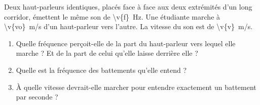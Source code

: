 Deux haut-parleurs identiques, placés face à face aux deux extrémités d'un long corridor, émettent le même son de \qty{\v{f}}{Hz}. Une étudiante marche à \qty{\v{vo}}{m/s} d'un haut-parleur vers l'autre. La vitesse du son est de \qty{\v{v}}{m/s}.

\begin{enumerate}[label=\alph*)]
    \item Quelle fréquence perçoit-elle de la part du haut-parleur vers lequel elle marche ? Et de la part de celui qu'elle laisse derrière elle ?
    \item Quelle est la fréquence des battements qu'elle entend ?
    \item À quelle vitesse devrait-elle marcher pour entendre exactement un battement par seconde ?
\end{enumerate}
